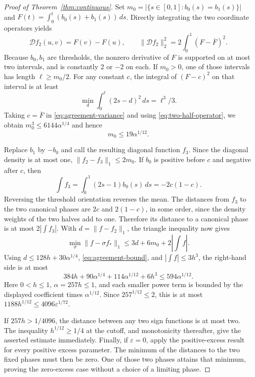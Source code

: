 \begin{proof}[Proof of Theorem~\ref{thm:continuous}]
Set $m_0=|\{s\in[0,1]:b_0(s)=b_1(s)\}|$ and
$F(t)=\int_0^t(b_0(s)+b_1(s))\,ds$.  Directly integrating the two
coordinate operators yields
\begin{equation}
 \mathcal D f_2(u,v)=F(v)-F(u),
 \qquad
 \|\mathcal D f_2\|_2^2=2\int_0^1(F-\overline F)^2.
 \label{eq:agreement-variance}
\end{equation}
Because $b_0,b_1$ are thresholds, the nonzero derivative of $F$ is
supported on at most two intervals, and is constantly $2$ or $-2$ on
each.  If $m_0>0$, one of those intervals has length
$\ell\ge m_0/2$.  For any constant $c$, the integral of $(F-c)^2$ on
that interval is at least
\[
 \min_d\int_0^\ell(2s-d)^2\,ds=\ell^3/3.
\]
Taking $c=\overline F$ in \eqref{eq:agreement-variance} and using
\eqref{eq:two-half-operator}, we obtain
$m_0^3\le6144\alpha^{1/4}$ and hence
\begin{equation}
 m_0\le19\alpha^{1/12}.
 \label{eq:agreement-bound}
\end{equation}

Replace $b_1$ by $-b_0$ and call the resulting diagonal function $f_3$.
Since the diagonal density is at most one,
$\|f_2-f_3\|_1\le2m_0$.  If $b_0$ is positive before $c$ and negative
after $c$, then
\[
 \int f_3=\int_0^1(2s-1)b_0(s)\,ds=-2c(1-c).
\]
Reversing the threshold orientation reverses the mean.  The distances
from $f_3$ to the two canonical phases are $2c$ and $2(1-c)$, in some
order, since the density weights of the two halves add to one.
Therefore its distance to a canonical phase is at most
$2|\int f_3|$.  With $d=\|f-f_2\|_1$, the triangle inequality now gives
\[
 \min_\sigma\|f-\sigma f_*\|_1
 \le3d+6m_0+2\left|\int f\right|.
\]
Using $d\le128h+30\alpha^{1/4}$,
\eqref{eq:agreement-bound}, and $|\int f|\le3h^3$, the right-hand side
is at most
\[
 384h+90\alpha^{1/4}+114\alpha^{1/12}+6h^3
 \le594\alpha^{1/12}.
\]
Here $0<h\le1$, $\alpha=257h\le1$, and each smaller power term is
bounded by the displayed coefficient times $\alpha^{1/12}$.
Since $257^{1/12}\le2$, this is at most
$1188h^{1/12}\le4096\varepsilon^{1/72}$.

If $257h>1/4096$, the distance between any two sign functions is at most
two.  The inequality $h^{1/12}\ge1/4$ at the cutoff, and monotonicity
thereafter, give the asserted estimate immediately.  Finally, if
$\varepsilon=0$, apply the positive-excess result for every positive
excess parameter.  The minimum of the distances to the two fixed phases
must then be zero.  One of those two phases attains that minimum, proving
the zero-excess case without a choice of a limiting phase.
\end{proof}

